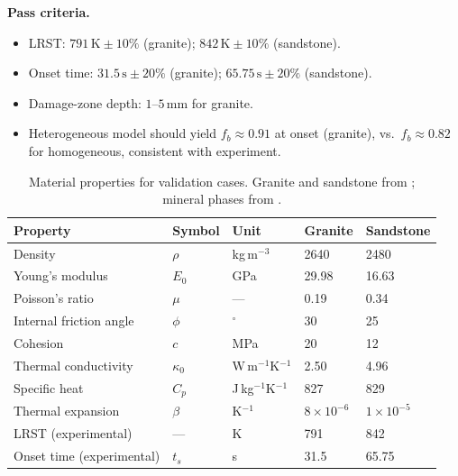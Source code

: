 \documentclass[12pt, a4paper]{article}
\begin{document}
\textbf{Pass criteria.}
\begin{itemize}[noitemsep]
    \item LRST: $791\,\mathrm{K} \pm 10\%$ (granite); $842\,\mathrm{K} \pm 10\%$
          (sandstone).
    \item Onset time: $31.5\,\mathrm{s} \pm 20\%$ (granite);
          $65.75\,\mathrm{s} \pm 20\%$ (sandstone).
    \item Damage-zone depth: $1$--$5\,\mathrm{mm}$ for granite.
    \item Heterogeneous model should yield $f_b \approx 0.91$ at onset (granite),
          vs.\ $f_b \approx 0.82$ for homogeneous, consistent with experiment.
\end{itemize}

\begin{table}[H]
\centering
\caption{Material properties for validation cases.  Granite and sandstone from
         \citet{hu2018lrst}; mineral phases from \citet{vogler2020simulation}.}
\label{tab:matprops}
\renewcommand{\arraystretch}{1.3}
\begin{tabular}{lllll}
\toprule
\textbf{Property} & \textbf{Symbol} & \textbf{Unit}
    & \textbf{Granite} & \textbf{Sandstone} \\
\midrule
Density                  & $\rho$    & kg\,m$^{-3}$ & 2640   & 2480  \\
Young's modulus          & $E_0$     & GPa          & 29.98  & 16.63 \\
Poisson's ratio          & $\mu$     & ---          & 0.19   & 0.34  \\
Internal friction angle  & $\phi$    & $^\circ$     & 30     & 25    \\
Cohesion                 & $c$       & MPa          & 20     & 12    \\
Thermal conductivity     & $\kappa_0$& W\,m$^{-1}$K$^{-1}$ & 2.50 & 4.96 \\
Specific heat            & $C_p$     & J\,kg$^{-1}$K$^{-1}$ & 827  & 829  \\
Thermal expansion        & $\beta$   & K$^{-1}$     & $8\times10^{-6}$ & $1\times10^{-5}$ \\
LRST (experimental)      & ---       & K            & 791    & 842   \\
Onset time (experimental)& $t_s$     & s            & 31.5   & 65.75 \\
\bottomrule
\end{tabular}
\end{table}

\end{document}
